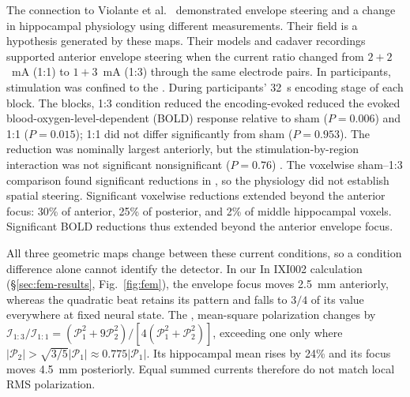 \documentclass[11pt,a4paper]{article}
\providecommand{\DIFaddtex}[1]{{\protect\color{blue} \sf #1}} %
\providecommand{\DIFdeltex}[1]{{\protect\color{red} \scriptsize #1}} %
\providecommand{\DIFaddbegin}{} %
\providecommand{\DIFaddend}{} %
\providecommand{\DIFdelbegin}{} %
\providecommand{\DIFdelend}{} %
\providecommand{\DIFadd}[1]{\texorpdfstring{\DIFaddtex{#1}}{#1}} %
\providecommand{\DIFdel}[1]{\texorpdfstring{\DIFdeltex{#1}}{}} %
\begin{document}
\DIFaddbegin \DIFadd{The connection to }\DIFaddend Violante et al.\ \cite{violante2023} \DIFdelbegin \DIFdel{demonstrated envelope steering and a change in hippocampal physiology using different measurements. Their field
}\DIFdelend \DIFaddbegin \DIFadd{is a hypothesis generated
by these maps. Their }\DIFaddend models and cadaver recordings supported anterior envelope
steering \DIFdelbegin \DIFdel{when the
current ratio changed }\DIFdelend from $2+2$~mA \DIFdelbegin \DIFdel{(1:1) }\DIFdelend to $1+3$~mA\DIFdelbegin \DIFdel{(1:3) through the same
electrode pairs. In participants, stimulation was confined to the }\DIFdelend \DIFaddbegin \DIFadd{. During participants' }\DIFaddend 32~s encoding \DIFdelbegin \DIFdel{stage of each block. The }\DIFdelend \DIFaddbegin \DIFadd{blocks,
}\DIFaddend 1:3 \DIFdelbegin \DIFdel{condition reduced the encoding-evoked
}\DIFdelend \DIFaddbegin \DIFadd{reduced the evoked }\DIFaddend blood-oxygen-level-dependent (BOLD) response relative
to sham ($P=0.006$) and 1:1 ($P=0.015$); 1:1 did not differ \DIFdelbegin \DIFdel{significantly }\DIFdelend from sham
($P=0.953$). The \DIFdelbegin \DIFdel{reduction was nominally largest anteriorly, but the }\DIFdelend stimulation-by-region interaction was \DIFdelbegin \DIFdel{not significant }\DIFdelend \DIFaddbegin \DIFadd{nonsignificant
}\DIFaddend ($P=0.76$)\DIFdelbegin \DIFdel{. The voxelwise sham--1:3 comparison
found significant reductions in }\DIFdelend \DIFaddbegin \DIFadd{, so the physiology did not establish spatial steering. Significant
voxelwise reductions extended beyond the anterior focus: }\DIFaddend 30\% of anterior,
25\% of posterior, and 2\% of middle hippocampal voxels.
\DIFdelbegin \DIFdel{Significant BOLD reductions thus extended beyond
the anterior envelope focus.
}\DIFdelend

\DIFdelbegin \DIFdel{All three geometric maps change between these current conditions, so a condition
difference alone cannot identify the detector. In our }\DIFdelend \DIFaddbegin \DIFadd{In }\DIFaddend IXI002\DIFdelbegin \DIFdel{calculation
(\S\ref{sec:fem-results}, Fig.~\ref{fig:fem}), the envelope focus moves 2.5~mm
anteriorly, whereas the quadratic beat retains its pattern and falls to $3/4$
of its value everywhere at fixed neural state. The }\DIFdelend \DIFaddbegin \DIFadd{, }\DIFaddend mean-square polarization \DIFdelbegin \DIFdel{changes by $\mathcal I_{1:3}/\mathcal I_{1:1}
=(\mathcal P_1^2+9\mathcal P_2^2)/[4(\mathcal P_1^2+\mathcal P_2^2)]$,
exceeding one only where $|\mathcal P_2|>\sqrt{3/5}|\mathcal P_1|
\approx0.775|\mathcal P_1|$. Its hippocampal mean }\DIFdelend rises by 24\% \DIFdelbegin \DIFdel{and its focus
moves 4.5~mm posteriorly. Equal summed currents therefore do not match local
RMS polarization.
}%
\end{document}
